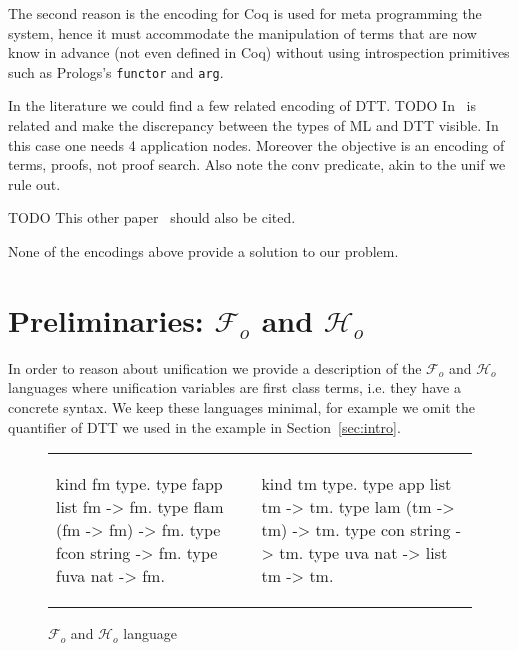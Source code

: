 \documentclass[sigconf,natbib=false]{acmart}
\newcommand{\Fo}{\ensuremath{\mathcal{F}_{\!o}\xspace}} %
\newcommand{\Ho}{\ensuremath{\mathcal{H}_o}\xspace}
\begin{document}
\noindent
The second reason is the encoding for Coq is used for meta programming the
system, hence it must accommodate the manipulation of terms that are now
know in advance (not even defined in Coq) without using introspection
primitives such as Prologs's \texttt{functor} and \texttt{arg}.

In the literature we could find a few related encoding of DTT.
TODO In~\cite{felty93lics} is related and make the
discrepancy between the types of ML and DTT visible. In this case
one needs 4 application nodes. Moreover the objective is an encoding
of terms, proofs, not proof search. Also note the conv predicate,
akin to the unif we rule out.

TODO This other paper~\cite{10.1007/978-3-031-38499-8_25} should also be cited.

None of the encodings above provide a solution to our problem.

\section{Preliminaries: \Fo{} and \Ho}
\label{sec:lang-spec}

In order to reason about unification we provide a description of the
\Fo{} and \Ho languages where unification variables
are first class terms, i.e. they have a concrete syntax. We keep these languages
minimal, for example we omit the  quantifier of DTT we used
in the example in Section~\ref{sec:intro}. 
%
\setlength{\abovecaptionskip}{0pt}
\setlength{\belowcaptionskip}{-13pt}

\begin{figure}[H]
  \begin{tabular}{ll}
  \begin{minipage}{0.21\textwidth}
  \begin{elpicodetab}
kind fm type.
type fapp list fm -> fm.
type flam (fm -> fm) -> fm.
type fcon string -> fm.
type fuva nat -> fm.
\end{elpicodetab}
  \end{minipage}
  &
  \begin{minipage}{0.24\textwidth}
  \begin{elpicodetab}
kind tm type.
type app list tm -> tm.
type lam (tm -> tm) -> tm.
type con string -> tm.
type uva nat -> list tm -> tm.
  \end{elpicodetab}
  \end{minipage}
  \end{tabular}
  \caption{\Fo{} and \Ho language}\vspace{0.3em}
  \label{code:common-terms}
\end{figure}
\end{document}
